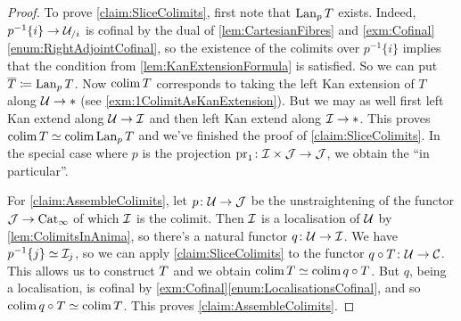 \begin{proof}
	To prove \cref{claim:SliceColimits}, first note that $\operatorname{Lan}_pT$ exists. Indeed, $p^{-1}\{i\}\rightarrow \mathcal{U}_{/i}$ is cofinal by the dual of \cref{lem:CartesianFibres} and \cref{exm:Cofinal}\cref{enum:RightAdjointCofinal}, so the existence of the colimits over $p^{-1}\{i\}$ implies that the condition from \cref{lem:KanExtensionFormula} is satisfied. So we can put $\ov T\coloneqq \Lan_pT$. Now $\operatorname*{colim} T$ corresponds to taking the left Kan extension of $T$ along $\mathcal{U}\rightarrow *$ (see \cref{exm:1ColimitAsKanExtension}). But we may as well first left Kan extend along $\mathcal{U}\rightarrow \mathcal{I}$ and then left Kan extend along $\mathcal{I}\rightarrow *$. This proves $\operatorname*{colim} T\simeq \operatorname*{colim} \operatorname{Lan}_pT$ and we've finished the proof of \cref{claim:SliceColimits}. In the special case where $p$ is the projection $\operatorname{pr}_1\colon \mathcal{I}\times\mathcal{J}\rightarrow \mathcal{J}$, we obtain the \enquote{in particular}.
	
	For \cref{claim:AssembleColimits}, let $p\colon \mathcal{U}\rightarrow \mathcal{J}$ be the unstraightening of the functor $\mathcal{J}\rightarrow \mathrm{Cat}_\infty$ of which $\mathcal{I}$ is the colimit. Then $\mathcal{I}$ is a localisation of $\mathcal{U}$ by \cref{lem:ColimitsInAnima}, so there's a natural functor $q\colon \mathcal{U}\rightarrow\mathcal{I}$. We have $p^{-1}\{j\}\simeq \mathcal{I}_j$, so we can apply \cref{claim:SliceColimits} to the functor $q\circ T\colon \mathcal{U}\rightarrow \mathcal{C}$. This allows us to construct $\ov T$ and we obtain $\colimit \ov T\simeq \colimit q\circ T$. But $q$, being a localisation, is cofinal by \cref{exm:Cofinal}\cref{enum:LocalisationsCofinal}, and so $\operatorname*{colim} q\circ T\simeq \operatorname*{colim} T$. This proves \cref{claim:AssembleColimits}.
\end{proof}
